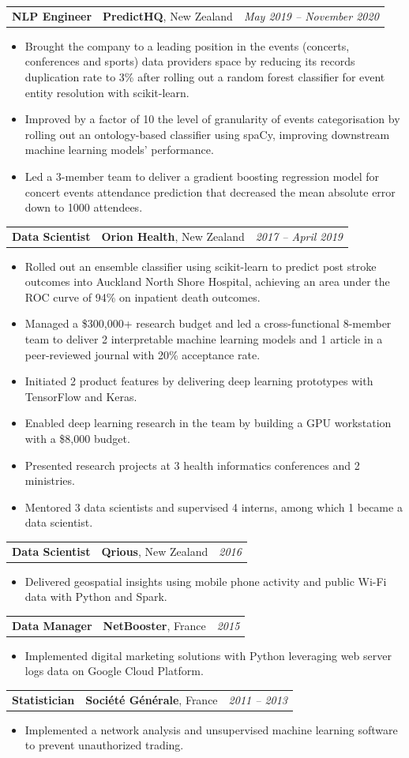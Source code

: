 \documentclass[letterpaper,11pt]{article}
\newcommand{\resumeItemListStart}{\begin{itemize}[label=$\circ$, topsep=0.1cm, parsep=0cm, partopsep=0cm, itemsep=0.1cm, leftmargin=0.4cm]}
\newcommand{\resumeItem}[1]{\item\small{#1}}
\newcommand{\resumeJustifiedItem}[1]{\item\begin{justify}\small{#1}\end{justify}}
\newcommand{\resumeItemListEnd}{\end{itemize}}
\newcommand{\job}[4]{
    \begin{tabular}{p{7cm}p{6cm}p{5cm}}
      \hspace{-0.7em} \textbf{#1} & \textbf{\small{#2}}\scriptsize{, #3} & \hfill \textit{\small{#4}}
    \end{tabular}
}
\begin{document}
\job {NLP Engineer}{PredictHQ}{New Zealand}{May 2019 -- November 2020}
\resumeItemListStart
\resumeJustifiedItem {Brought the company to a leading position in the events (concerts, conferences and sports) data providers space by reducing its records duplication rate to 3\% after rolling out a random forest classifier for event entity resolution with scikit-learn.}
\resumeJustifiedItem {Improved by a factor of 10 the level of granularity of events categorisation by rolling out an ontology-based classifier using spaCy, improving downstream machine learning models' performance.}
\resumeJustifiedItem {Led a 3-member team to deliver a gradient boosting regression model for concert events attendance prediction that decreased the mean absolute error down to 1000 attendees.}
\resumeItemListEnd \vspace{0.2cm}
	
\job {Data Scientist}{Orion Health}{New Zealand}{2017 -- April 2019}
\resumeItemListStart
\resumeJustifiedItem {Rolled out an ensemble classifier using scikit-learn to predict post stroke outcomes into Auckland North Shore Hospital, achieving an area under the ROC curve of 94\% on inpatient death outcomes.}
\resumeJustifiedItem {Managed a \$300,000+ research budget and led a cross-functional 8-member team to deliver 2 interpretable machine learning models and 1 article in a peer-reviewed journal with 20\% acceptance rate.}
\resumeItem {Initiated 2 product features by delivering deep learning prototypes with TensorFlow and Keras.}
\resumeItem {Enabled deep learning research in the team by building a GPU workstation with a \$8,000 budget.}
\resumeItem {Presented research projects at 3 health informatics conferences and 2 ministries.}
\resumeItem {Mentored 3 data scientists and supervised 4 interns, among which 1 became a data scientist.}
\resumeItemListEnd \vspace{0.2cm}

\job {Data Scientist}{Qrious}{New Zealand}{2016}
\resumeItemListStart
\resumeItem {Delivered geospatial insights using mobile phone activity and public Wi-Fi data with Python and Spark.}
\resumeItemListEnd \vspace{0.2cm}

\job {Data Manager}{NetBooster}{France}{2015}
\resumeItemListStart
\resumeItem {Implemented digital marketing solutions with Python leveraging web server logs data on Google Cloud Platform.}
\resumeItemListEnd \vspace{0.2cm}

\job {Statistician}{Société Générale}{France}{2011 -- 2013}
\resumeItemListStart
\resumeItem {Implemented a network analysis and unsupervised machine learning software to prevent unauthorized trading.}
\resumeItemListEnd 
\end{document}
